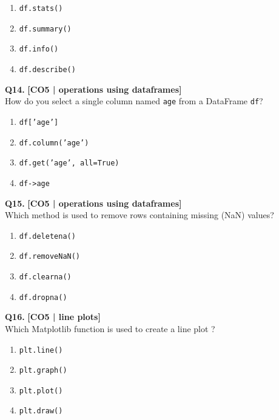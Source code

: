 \begin{enumerate}[label=(\alph*),topsep=2pt,itemsep=1pt,partopsep=0pt,parsep=0pt]
    \item \relax \texttt{df.stats()}
    \item \relax \texttt{df.summary()}
    \item \relax \texttt{df.info()}
    \item \relax \texttt{df.describe()}
\end{enumerate}
\vspace{{2mm}}

\noindent\textbf{Q14.} \hfill {\small\color{LPUOrange}\textbf{[CO5 | operations using dataframes]}}\\[2pt]
How do you select a single column named \texttt{age} from a DataFrame \texttt{df}?

\begin{enumerate}[label=(\alph*),topsep=2pt,itemsep=1pt,partopsep=0pt,parsep=0pt]
    \item \relax \texttt{df['age']}
    \item \relax \texttt{df.column('age')}
    \item \relax \texttt{df.get('age', all=True)}
    \item \relax \texttt{df->age}
\end{enumerate}
\vspace{{2mm}}

\noindent\textbf{Q15.} \hfill {\small\color{LPUOrange}\textbf{[CO5 | operations using dataframes]}}\\[2pt]
Which method is used to remove rows containing missing (NaN) values?

\begin{enumerate}[label=(\alph*),topsep=2pt,itemsep=1pt,partopsep=0pt,parsep=0pt]
    \item \relax \texttt{df.deletena()}
    \item \relax \texttt{df.removeNaN()}
    \item \relax \texttt{df.clearna()}
    \item \relax \texttt{df.dropna()}
\end{enumerate}
\vspace{{2mm}}

\noindent\textbf{Q16.} \hfill {\small\color{LPUOrange}\textbf{[CO5 | line plots]}}\\[2pt]
Which Matplotlib function is used to create a line plot ?

\begin{enumerate}[label=(\alph*),topsep=2pt,itemsep=1pt,partopsep=0pt,parsep=0pt]
    \item \relax \texttt{plt.line()}
    \item \relax \texttt{plt.graph()}
    \item \relax \texttt{plt.plot()}
    \item \relax \texttt{plt.draw()}
\end{enumerate}
\vspace{{2mm}}

